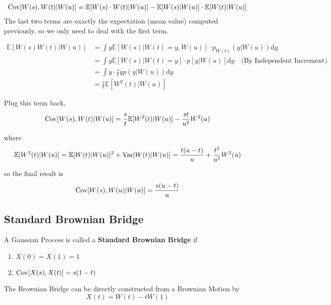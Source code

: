        \begin{align*}
            \mathrm{Cov}[W(s), W(t) | W(u)] &= \mathbb{E}[W(s) \cdot W(t) | W(u)] - \mathbb{E}[W(s) | W(u)] \cdot \mathbb{E}[W(t) | W(u)]\\
        \end{align*}
        The last two terms are exactly the expectation (mean value) computed previously, so we only need to deal with the first term.

        \begin{align*}
            \mathbb{E}[W(s)W(t)|W(u)] &= \int y \mathbb{E}[W(s)|W(t)=y, W(u)]\cdot p_{W(t)}(y|W(u)) \mathrm{d}y\\
            &= \int y \mathbb{E}[W(s) | W(t) = y] \cdot p[y|W(u)]\mathrm{d}y \quad \text{(By Independent Increment)}\\
            &= \int y \cdot \frac{s}{t}y p(y|W(u))\mathrm{d}y\\
            &= \frac{s}{t}\mathbb{E}[W^2(t)|W(u)]
        \end{align*}
        
        Plug this term back,
        \[
            \mathrm{Cov}[W(s), W(t) | W(u)] = \frac{s}{t}\mathbb{E}[W^2(t)|W(u)] - \frac{st}{u^2}W^2(u)
        \]

        where
        \[ \mathbb{E}[W^2(t)|W(u)] = \mathbb{E}[W(t)|W(u)]^2 + \mathrm{Var}[W(t)|W(u)] = \frac{t(u-t)}{u} + \frac{t^2}{u^2}W^2(u) \]

        so the final result is
        \[ \mathrm{Cov}[W(s), W(u) | W(u)] = \frac{s(u-t)}{u} \]

    \subsection{Standard Brownian Bridge}
        \begin{definition}\label{def:BrownianBridgeStd}
            A Gaussian Process is called a \textbf{Standard Brownian Bridge} if
            \begin{enumerate}
                \item $X(0) = X(1) = 1$
                \item $\mathrm{Cov}[X(s), X(t)] = s(1-t)$
            \end{enumerate}
        \end{definition}
        \begin{remark}
            The Brownian Bridge can be directly constructed from a Brownian Motion by
            \[ X(t) = W(t) - tW(1) \]
        \end{remark}

